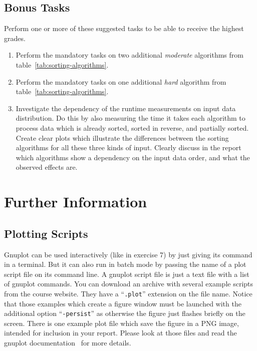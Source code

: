 \documentclass[a4paper,10pt]{article}
\begin{document}
\subsection*{Bonus Tasks}

Perform one or more of these suggested tasks to be able to receive the highest grades.

\begin{enumerate}
  
\item
  Perform the mandatory tasks on two additional \emph{moderate} algorithms from table~\ref{tab:sorting-algorithms}.
  
\item
  Perform the mandatory tasks on one additional \emph{hard} algorithm from table~\ref{tab:sorting-algorithms}.
  
\item
  Investigate the dependency of the runtime measurements on input data distribution.
  Do this by also measuring the time it takes each algorithm to process data which is already sorted, sorted in reverse, and partially sorted.
  Create clear plots which illustrate the differences between the sorting algorithms for all these three kinds of input.
  Clearly discuss in the report which algorithms show a dependency on the input data order, and what the observed effects are.
  
\end{enumerate}



\section*{Further Information}



\subsection*{Plotting Scripts}

Gnuplot can be used interactively (like in exercise 7) by just giving its command in a terminal.
But it can also run in batch mode by passing the name of a plot script file on its command line.
A gnuplot script file is just a text file with a list of gnuplot commands.
You can download an archive with several example scripts from the course website.
They have a ``\texttt{.plot}'' extension on the file name.
Notice that those examples which create a figure window must be launched with the additional option ``\texttt{-persist}'' as otherwise the figure just flashes briefly on the screen.
There is one example plot file which save the figure in a PNG image, intended for inclusion in your report.
Please look at those files and read the gnuplot documentation~\cite{gnuplot} for more details.
\end{document}
